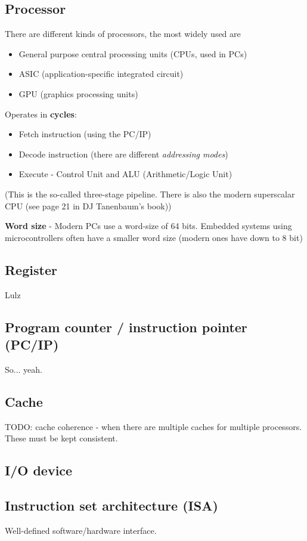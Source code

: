 \documentclass{article}
\begin{document}
\subsection{Processor}
There are different kinds of processors, the most widely used are
\begin{itemize}
	\item General purpose central processing units (CPUs, used in PCs)
	\item ASIC (application-specific integrated circuit)
	\item GPU (graphics processing units)
\end{itemize}

Operates in \textbf{cycles}:
\begin{itemize}
	\item Fetch instruction (using the PC/IP)
	\item Decode instruction (there are different \emph{addressing modes})
	\item Execute - Control Unit and ALU (Arithmetic/Logic Unit)
\end{itemize}
(This is the so-called three-stage pipeline. There is also the modern superscalar CPU (see page 21 in DJ Tanenbaum's book))

\textbf{Word size} - Modern PCs use a word-size of 64 bits. Embedded systems using microcontrollers often have a smaller word size (modern ones have down to 8 bit)

\subsection{Register}
Lulz

\subsection{Program counter / instruction pointer (PC/IP)}
So... yeah.

\subsection{Cache}
TODO: cache coherence - when there are multiple caches for multiple processors. These must be kept consistent.

\subsection{I/O device}

\subsection{Instruction set architecture (ISA)}
Well-defined software/hardware interface.
\end{document}
